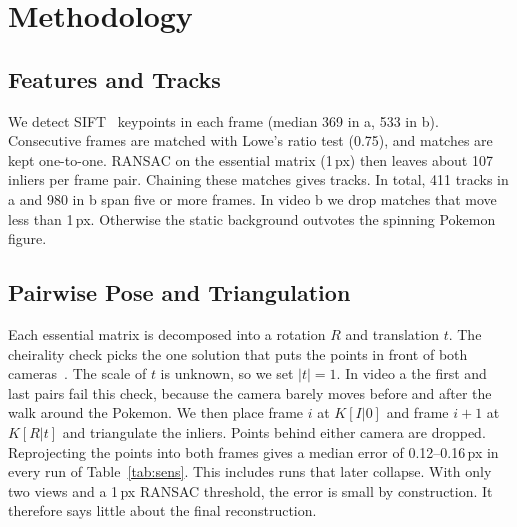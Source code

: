 \documentclass[conference]{assets/latex/IEEEtran}
\begin{document}
\section{Methodology}

\subsection{Features and Tracks}

We detect SIFT~\cite{lowe2004sift} keypoints in each frame (median 369 in a,
533 in b). Consecutive frames are matched with Lowe's ratio test (0.75), and
matches are kept one-to-one. RANSAC on the essential matrix (1\,px) then leaves
about 107 inliers per frame pair. Chaining these matches gives tracks. In total,
411 tracks in a and 980 in b span five or more frames. In video b we drop
matches that move less than 1\,px. Otherwise the static background outvotes the
spinning Pokemon figure.

\subsection{Pairwise Pose and Triangulation}\label{sec:pose}
Each essential matrix is decomposed into a rotation $R$ and translation $t$.
The cheirality check picks the one solution that puts the points in front of
both cameras~\cite{foundationsCVbook}. The scale of $t$ is unknown, so we set
$|t|=1$. In video a the first and last pairs fail this check, because the
camera barely moves before and after the walk around the Pokemon. We then place frame $i$ at $K[I|0]$ and frame $i{+}1$
at $K[R|t]$ and triangulate the inliers. Points behind either camera are
dropped. Reprojecting the points into both frames gives a median error of
0.12--0.16\,px in every run of Table~\ref{tab:sens}. This includes runs that
later collapse. With only two views and a 1\,px RANSAC threshold, the error is
small by construction. It therefore says little about the final reconstruction.
\end{document}
